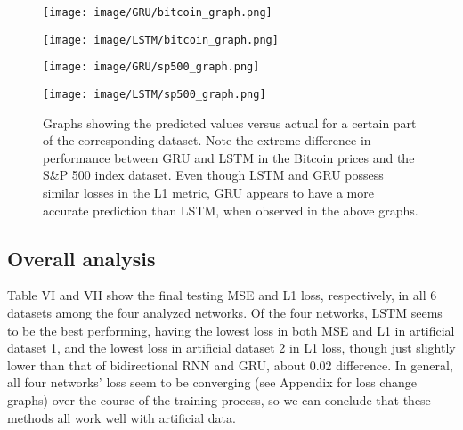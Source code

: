 \documentclass[letterpaper, 10 pt, conference]{ieeeconf}  %
\begin{document}
        \begin{figure*}
            \centering
            \begin{minipage}{\columnwidth}
                \centering
                \texttt{[image: image/GRU/bitcoin\_graph.png]}
                \label{label1}
            \end{minipage}%
            \begin{minipage}{\columnwidth}
                \centering
                \texttt{[image: image/LSTM/bitcoin\_graph.png]}
                \label{label2}
            \end{minipage}
            \begin{minipage}{\columnwidth}
                \centering
                \texttt{[image: image/GRU/sp500\_graph.png]}
                \label{label3}
            \end{minipage}%
            \begin{minipage}{\columnwidth}
                \centering
                \texttt{[image: image/LSTM/sp500\_graph.png]}
                \label{label4}
            \end{minipage}
            \captionsetup{margin=1.5cm}
            \caption{Graphs showing the predicted values versus actual for a certain part of the corresponding dataset. Note the extreme difference in performance between GRU and LSTM in the Bitcoin prices and the S\&P 500 index dataset. Even though LSTM and GRU possess similar losses in the L1 metric, GRU appears to have a more accurate prediction than LSTM, when observed in the above graphs.}
        \end{figure*}
    \subsection{Overall analysis}
        Table VI and VII show the final testing MSE and L1 loss, respectively, in all 6 datasets among the four analyzed networks. Of the four networks, LSTM seems to be the best performing, having the lowest loss in both MSE and L1 in artificial dataset 1, and the lowest loss in artificial dataset 2 in L1 loss, though just slightly lower than that of bidirectional RNN and GRU, about 0.02 difference. In general, all four networks' loss seem to be converging (see Appendix for loss change graphs) over the course of the training process, so we can conclude that these methods all work well with artificial data.
\end{document}
